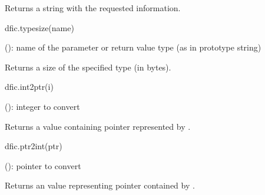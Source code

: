 \documentclass[a4paper,12pt,twoside,extrafontsizes]{memoir}
\begin{document}
\begin{funcret}
	Returns a string with the requested information.
\end{funcret}


\begin{luafuncprototype}
dfic.typesize(name)
\end{luafuncprototype}

\begin{funcparams}
	 (): name of the parameter or return value type (as in prototype string)
\end{funcparams}

\begin{funcret}
	Returns a size of the specified type (in bytes).
\end{funcret}


\begin{luafuncprototype}
dfic.int2ptr(i)
\end{luafuncprototype}

\begin{funcparams}
	 (): integer to convert
\end{funcparams}

\begin{funcret}
	Returns a  value containing pointer represented by .
\end{funcret}


\begin{luafuncprototype}
dfic.ptr2int(ptr)
\end{luafuncprototype}

\begin{funcparams}
	 (): pointer to convert
\end{funcparams}

\begin{funcret}
	Returns an  value representing pointer contained by .
\end{funcret}

\end{document}

